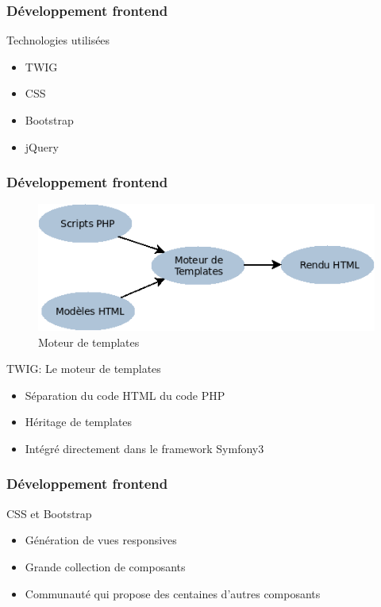 \speaker{\Juliana}

\begin{frame}
\frametitle{Développement frontend}
\begin{block}{Technologies utilisées}
	\begin{itemize}
		\item TWIG
		\item CSS
		\item Bootstrap
		\item jQuery
	\end{itemize}
\end{block}
\end{frame}

\begin{frame}
\frametitle{Développement frontend}



      \begin{figure}[r]
		\includegraphics[scale=0.3]{images/moteursTemp.png}
		\caption{Moteur de templates}
	  \end{figure}
\begin{block}{TWIG: Le moteur de templates }
	
		\begin{itemize}
			\item Séparation du code HTML du code PHP
			\item Héritage de templates
			\item Intégré directement dans le framework Symfony3
		\end{itemize}
\end{block}
\end{frame}

\begin{frame}
\frametitle{Développement frontend}
\begin{block}{ CSS et Bootstrap }
	\begin{itemize}
		\item Génération de vues responsives
		\item Grande collection de composants
		\item Communauté qui propose des centaines d'autres composants
	\end{itemize}
\end{block}
\end{frame}

